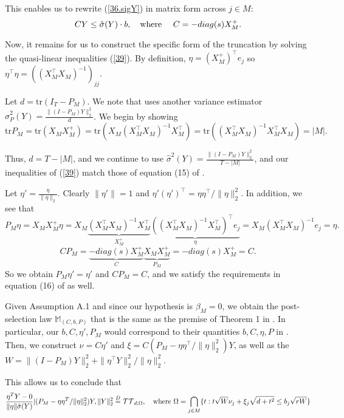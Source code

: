 \documentclass[11pt]{article}
\newcommand{\q}{\text{\quad}}
\newcommand{\wh}{\text{where }}
\newcommand{\tr}{\mathrm{tr}}
\begin{document}
This enables us to rewrite (\ref{36.sigY}) in matrix form across $j\in M$:
	\begin{equation}\label{39}
		C Y\leq \hat{\sigma}(Y)\cdot b,\q\wh\q
			C=-diag(s) X_M^+.
	\end{equation}

Now, it remains for us to construct the specific form of the truncation by solving the quasi-linear inequalities (\ref{39}). By definition, $\eta=(X_M^+)^\top e_j$ so $\eta^\top \eta =((X_M^\top X_M )^{-1})_{jj}$. 

Let $d=\tr(I_T-P_M)$. We note that \cite{tian2017selective} uses another variance estimator $\hat{\sigma}_P^2(Y)=\frac{\|(I-P_M)Y\|_2^2}{d}$. We begin by showing
\begin{equation}
	\tr P_M
	=\tr( X_MX_M^+)
	=\tr \left(X_M(X_M^\top X_M)^{-1}X_M^\top\right)
	=\tr \left( (X_M^\top X_M)^{-1}X_M^\top X_M\right) = |M|.
\end{equation}

Thus, $d=T-|M|$, and we continue to use $\hat{\sigma}^2(Y)=\frac{\|(I-P_M)Y\|_2^2}{T-|M|}$, and our inequalities of (\ref{39})  match those of equation (15) of \cite{tian2017selective}.

Let $\eta'=\frac{\eta}{\|\eta\|_2}$. Clearly $\|\eta'\|=1$ and $\eta'(\eta')^\top=\eta\eta^\top/\|\eta\|_2^2$. In addition, we see that
\begin{equation}
P_M\eta=X_MX_M^+\eta=X_M\underbrace{(X_M^\top X_M)^{-1}X_M^\top}_{X_M^+}
\underbrace{((X_M^\top X_M)^{-1}X_M^\top)^\top e_j}_{\eta}=X_M(X_M^\top X_M)^{-1} e_j=\eta.
\end{equation}
\begin{equation}
CP_M=\underbrace{-  diag(s) X_M^+}_{C}
\underbrace{X_MX_M^+}_{P_M}=- diag(s) X_M^+=C.
\end{equation}
So we obtain $P_M\eta'=\eta'$ and $CP_M=C$, and we satisfy the requirements in equation (16) of \cite{tian2017selective} as well. 

Given Assumption A.1 and since our hypothesis is $\beta_M=0$, we obtain the post-selection law $\mathbb{M}_{(C,b,P)}$ that is the same as the premise of Theorem 1 in \cite{tian2017selective}. In particular, our $b,C,\eta', P_M$ would correspond to their quantities $b,C,\eta,P$ in \cite{tian2017selective}. Then, we construct $\nu=C\eta'$ and $\xi=C (P_M-\eta\eta^\top /\|\eta\|_2^2 )Y$, as well as the $W=\|(I-P_M)Y\|_2^2+\|\eta^\top Y\|_2^2/\|\eta\|_2^2$.

This allows us to conclude that
\begin{equation}
	\frac{\eta^TY-0}{\|\eta\|\hat{\sigma}(Y)}
	| (P_M-\eta\eta^T /\|\eta\|_2^2)Y,\|Y\|_2^2\stackrel{D}{=}\mathcal{TT}_{d;\Omega},\q\wh \Omega=
		\bigcap_{j\in M}\{t:t\sqrt{W}\nu_j+\xi_j\sqrt{d+t^2}\leq b_j\sqrt{rW}\}
	\end{equation}
\end{document}
